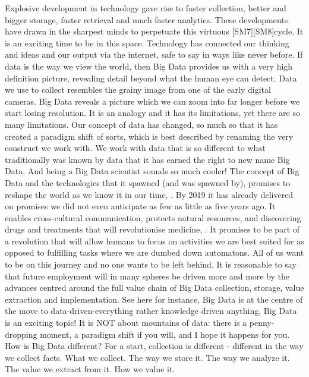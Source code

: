 Explosive development in technology gave rise to faster collection, better and bigger storage, faster retrieval and much faster analytics.  These developments have drawn in the sharpest minds to perpetuate this virtuous [SM7][SM8]cycle.  It is an exciting time to be in this space.  Technology has connected our thinking and ideas and our output via the internet, safe to say in ways like never before.
If data is the way we view the world, then Big Data provides us with a very high definition picture, revealing detail beyond what the human eye can detect.   Data we use to collect resembles the grainy image from one of the early digital cameras.  Big Data reveals a picture which we can zoom into far longer before we start losing resolution.  It is an analogy and it has its limitations, yet there are so many limitations. 
Our concept of data has changed, so much so that it has created a paradigm shift of sorts, which is best described by renaming the very construct we work with.  We work with data that is so different to what traditionally was known by data that it has earned the right to new name Big Data.  And being a Big Data scientist sounds so much cooler!
The concept of Big Data and the technologies that it spawned (and was spawned by), promises to reshape the world as we know it in our time, \cite{Sch17}. By 2019 it has already delivered on promises we did not even anticipate as few as little as five years ago.  It enables cross-cultural communication, protects natural resources, and discovering drugs and treatments that will revolutionise medicine,  \cite{Hey09}. It promises to be part of a revolution that will allow humans to focus on activities we are best suited for as opposed to fulfilling tasks where we are dumbed down automatons.   All of us want to be on this journey and no one wants to be left behind.  It is reasonable to say that future employment will in many spheres be driven more and more by the advances centred around the full value chain of Big Data  collection, storage, value extraction and implementation. See here for instance, \cite{Mar15}   Big Data is at the centre of the move to data-driven-everything rather knowledge driven anything, \cite{Kit81}
Big Data is an exciting topic!  It is NOT about mountains of data:  there is a penny-dropping moment, a paradigm shift if you will, and I hope it happens for you.  How is Big Data different?  For a start, collection is different - different in the way we collect facts.  What we collect.  The way we store it.  The way we analyze it.  The value we extract from it.  How we value it.  
